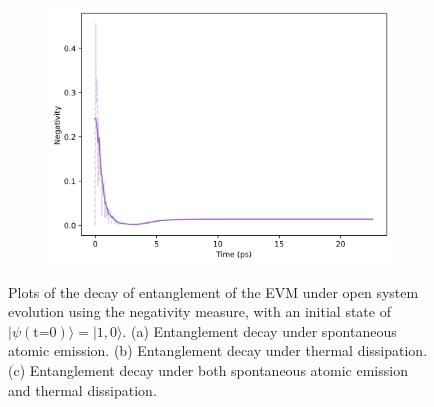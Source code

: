 \documentclass[11pt]{article}
\begin{document}
\begin{figure}[H]
    \vspace{0.5cm}
    
    \begin{subfigure}{0.45\textwidth}
        \centering
        \includegraphics[width=\linewidth]{Research Project/Code/results/ExVib/Open/Negativity/neg_both_e0.png}
        \caption{}
        \label{fig:EVM_OQS_Neg_both}
    \end{subfigure}
    \hfill

    \caption{Plots of the decay of entanglement of the EVM under open system evolution using the negativity measure, with an initial state of $|\psi (\text{t=0})\rangle = |1, 0\rangle$. (a) Entanglement decay under spontaneous atomic emission. (b) Entanglement decay under thermal dissipation. (c) Entanglement decay under both spontaneous atomic emission and thermal dissipation.}
    \label{fig:EVM_OQS_Neg}
\end{figure}
\end{document}
